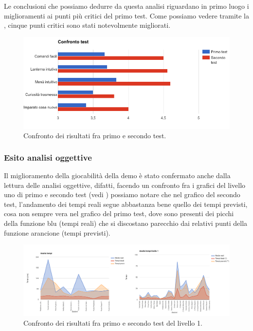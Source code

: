 Le conclusioni che possiamo dedurre da questa analisi riguardano in primo luogo i miglioramenti ai punti più critici del primo test. Come possiamo vedere tramite la \myfig{\ref{fig:test-confronto}}, cinque punti critici sono stati notevolmente migliorati.

\begin{figure}[h]
\centerline{\includegraphics[scale=0.55]{images/risultati/test-confronto.png}}
\caption{Confronto dei risultati fra primo e secondo test.}
\label{fig:test-confronto}
\end{figure}

\subsubsection{Esito analisi oggettive}

Il miglioramento della giocabilità della demo è stato confermato anche dalla lettura delle analisi oggettive, difatti, facendo un confronto fra i grafici del livello uno di primo e secondo test (vedi \myfig{\ref{fig:test-confronto-tempi1}}) possiamo notare che nel grafico del secondo test, l'andamento dei tempi reali segue abbastanza bene quello dei tempi previsti, cosa non sempre vera nel grafico del primo test, dove sono presenti dei picchi della funzione blu (tempi reali) che si discostano parecchio dai relativi punti della funzione arancione (tempi previsti).

\begin{figure}[h]
\centerline{\includegraphics[scale=0.3]{images/risultati/test-confronto-tempi1.png}}
\caption{Confronto dei risultati fra primo e secondo test del livello 1.}
\label{fig:test-confronto-tempi1}
\end{figure}

